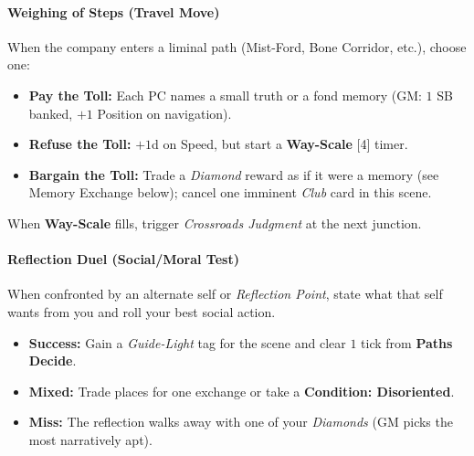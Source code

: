\paragraph{Weighing of Steps (Travel Move)}
When the company enters a liminal path (Mist-Ford, Bone Corridor, etc.), choose one:
\begin{itemize}
  \item \textbf{Pay the Toll:} Each PC names a small truth or a fond memory (GM: $1$ SB banked, $+1$ Position on navigation).
  \item \textbf{Refuse the Toll:} $+1$d on Speed, but start a \textbf{Way-Scale} [4] timer.
  \item \textbf{Bargain the Toll:} Trade a \emph{Diamond} reward as if it were a memory (see Memory Exchange below); cancel one imminent \emph{Club} card in this scene.
\end{itemize}
When \textbf{Way-Scale} fills, trigger \emph{Crossroads Judgment} at the next junction.

\paragraph{Reflection Duel (Social/Moral Test)}
When confronted by an alternate self or \emph{Reflection Point}, state what that self wants from you and roll your best social action.
\begin{itemize}
  \item \textbf{Success:} Gain a \emph{Guide-Light} tag for the scene and clear $1$ tick from \textbf{Paths Decide}.
  \item \textbf{Mixed:} Trade places for one exchange or take a \textbf{Condition: Disoriented}.
  \item \textbf{Miss:} The reflection walks away with one of your \emph{Diamonds} (GM picks the most narratively apt).
\end{itemize}

